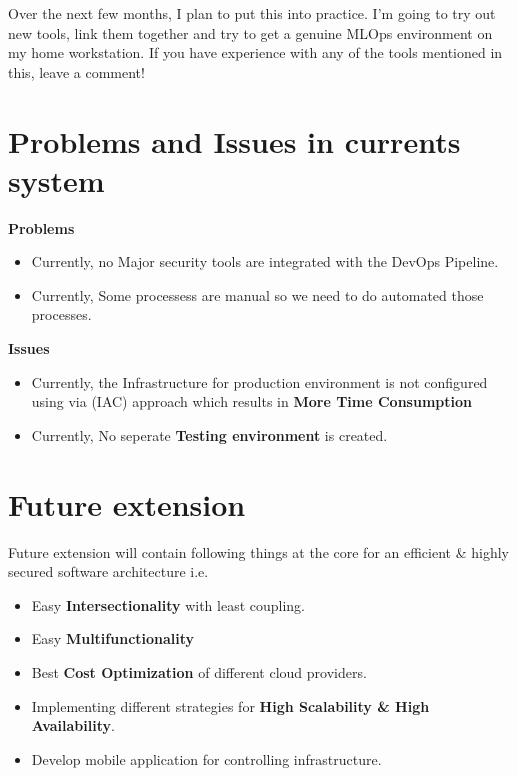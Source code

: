 \documentclass[12pt,oneside,a4paper]{report}
\begin{document}
Over the next few months, I plan to put this into practice. I’m going to try out new tools, link them together and try to get a genuine MLOps environment on my home workstation. If you have experience with any of the tools mentioned in this, leave a comment!
\section{Problems and Issues in currents system}
\large{\textbf{Problems}}
\fontsize{12pt}{10pt}\selectfont
\begin{itemize}
\item Currently, no Major security tools are integrated with the DevOps Pipeline.
\item Currently, Some processess are manual so we need to do automated those processes.
\end{itemize}
\large{\textbf{Issues}}
\fontsize{12pt}{10pt}\selectfont
\begin{itemize}
\item Currently, the Infrastructure for production environment is not configured using via (IAC) approach which results in \textbf{More Time Consumption}
\item Currently, No seperate \textbf{Testing environment} is created. 
\end{itemize}
\section{Future extension}
\fontsize{12pt}{10pt}\selectfont
Future extension will contain following things at the core for an efficient \& highly secured software architecture i.e.
\begin{itemize}
\item Easy \textbf{Intersectionality} with least coupling.
\item Easy \textbf{Multifunctionality} 
\item Best \textbf{Cost Optimization} of different cloud providers.
\item Implementing different strategies for \textbf{High Scalability \& High Availability}.
\item Develop mobile application for controlling infrastructure.
\end{itemize}
\end{document}
